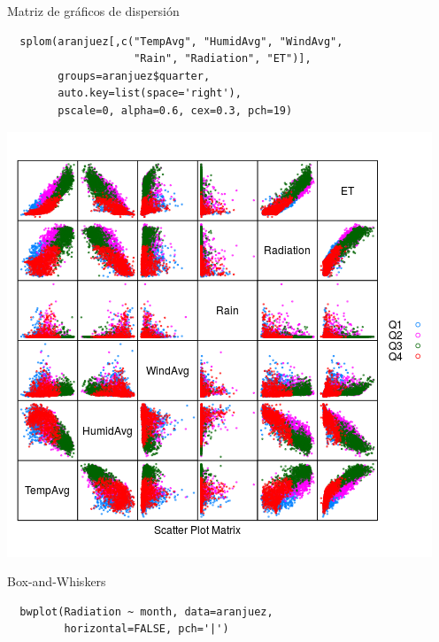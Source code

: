 \documentclass[xcolor={usenames,svgnames,dvipsnames}]{beamer}
\begin{document}
\begin{frame}[fragile,label=sec-6-1-10]{Matriz de gráficos de dispersión}
 \lstset{language=R,label= ,caption= ,numbers=none}
\begin{lstlisting}
  splom(aranjuez[,c("TempAvg", "HumidAvg", "WindAvg",
                    "Rain", "Radiation", "ET")],
        groups=aranjuez$quarter,
        auto.key=list(space='right'),
        pscale=0, alpha=0.6, cex=0.3, pch=19)
\end{lstlisting}
\end{frame}

\begin{frame}[label=sec-6-1-11]{}
\includegraphics[width=.9\linewidth]{figs/splomGroup.png}
\end{frame}

\begin{frame}[fragile,label=sec-6-1-12]{Box-and-Whiskers}
 \lstset{language=R,label= ,caption= ,numbers=none}
\begin{lstlisting}
  bwplot(Radiation ~ month, data=aranjuez,
         horizontal=FALSE, pch='|')
\end{lstlisting}
\end{frame}
\end{document}
